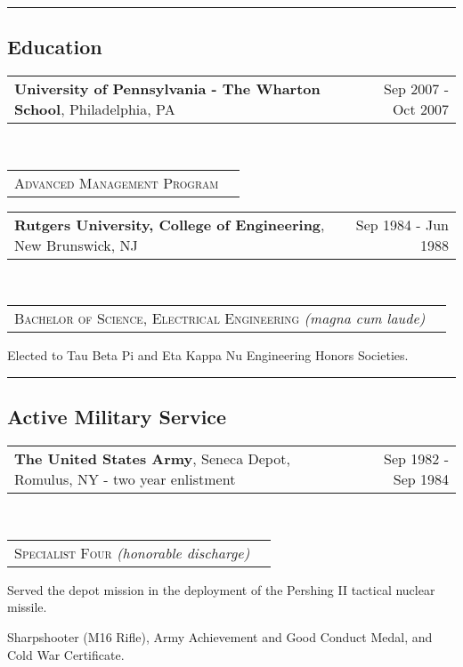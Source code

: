 \documentclass[10pt,letterpaper]{extarticle}
\makeatletter
\newcommand{\headerrow}[2]
{\begin{tabular*}{\linewidth}{l@{\extracolsep{\fill}}r}
	#1 &
	#2 \\
\end{tabular*}}
\makeatother
\begin{document}

\hrule
\vspace{-1em}\subsection*{\Large Education}\vspace{-0.5em}

	\item[]
	\headerrow
		{\large \textbf{University of Pennsylvania - The Wharton School}, Philadelphia, PA}
		{Sep 2007 - Oct 2007}
	\\
	\headerrow
		{\large \textsc{Advanced Management Program}}
		{}
	\item[]
	\headerrow
		{\large \textbf{Rutgers University, College of Engineering}, New Brunswick, NJ}
		{Sep 1984 - Jun 1988}
	\\
	\headerrow
		{\large \textsc{Bachelor of Science, Electrical Engineering} \emph{(magna cum laude)}}
		{}
	\vspace{-1.8em}\begin{itemize*}
		\item Elected to Tau Beta Pi and Eta Kappa Nu Engineering Honors Societies.
	\end{itemize*}

\hrule
\vspace{-1em}\subsection*{\Large Active Military Service}\vspace{-0.5em}
	
	\item[]
	\headerrow
		{\large \textbf{The United States Army}, Seneca Depot, Romulus, NY - two year enlistment}
		{Sep 1982 - Sep 1984}
	\\
	\headerrow
		{\large \textsc{Specialist Four} \emph{(honorable discharge)}}
		{}
	\vspace{-2em}\begin{itemize*}
		\item Served the depot mission in the deployment of the Pershing II tactical nuclear
		missile.
		\item Sharpshooter (M16 Rifle), Army Achievement and Good Conduct Medal, and Cold War
		Certificate.
	\end{itemize*}
\end{document}
